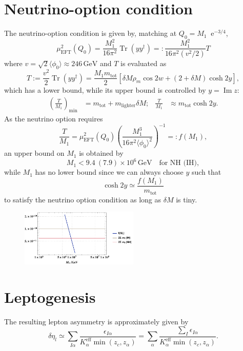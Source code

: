 \documentclass[a4paper,11pt]{scrartcl}
\numberwithin{equation}{section}
\newcommand\w[1]{_{\mathrm{#1}}}
\newcommand\ee{\mathop{}\!\mathrm{e}}
\DeclareMathOperator{\Tr}{\mathrm{Tr}}
\newcommand\vev[1]{\langle#1\rangle}
\newcommand\unit[1]{\,\mathrm{#1}\xspace}
\newcommand\GeV{\unit{GeV}}
\renewcommand{\Im}{\mathop{\mathrm{Im}}}
\newcommand\mtot{m_{\mathrm{tot}}}
\newcommand\yydag{(yy^\dagger)}
\begin{document}
\section{Neutrino-option condition}
The neutrino-option condition is given by, matching at $Q_0=M_1\ee^{-3/4}$,
\begin{equation}
 \mu^2\w{EFT}(Q_0)
= \frac{M_1^2}{16\pi^2}\Tr\yydag
=: \frac{M_1^2}{16\pi^2(v^2/2)}T
\end{equation}
where $v=\sqrt2\vev{\phi_0}\approx246\GeV$ and $T$ is evaluated as
\begin{equation}
 T :=\frac{v^2}{2}\Tr\yydag
   = \frac{M_1\mtot}{2}\left[\delta M \rho_m\cos2w + (2+\delta M)\cosh2y\right],
\end{equation}
which has a lower bound, while its upper bound is controlled by $y=\Im z$:
\begin{align}
\left(\frac{T}{M_1}\right)\w{min}&=\mtot + m\w{lighter}\delta M;&
\frac{T}{M_1}&\approx\mtot\cosh2y.
\end{align}
As the neutrino option requires
\begin{equation}
  \frac{T}{M_1}
=
  \mu^2\w{EFT}(Q_0) \left(\frac{M_1^3}{16\pi^2\vev{\phi_0}^2}\right)^{-1}=:f(M_1),
\end{equation}
an upper bound on $M_1$ is obtained by
\begin{equation}
 M_1<9.4\ (7.9)\times10^6\GeV\quad\text{for NH (IH)},
\end{equation}
while $M_1$ has no lower bound since we can always choose $y$ such that
\begin{equation}
 \cosh2y\simeq \frac{f(M_1)}{\mtot}
\end{equation}
to satisfy the neutrino option condition as long as $\delta M$ is tiny.



\begin{figure}[ht]
  \centering
  \includegraphics[width=0.5\textwidth]{bfp_analysis_fplot.pdf}
\end{figure}



\section{Leptogenesis}
The resulting lepton asymmetry is approximately given by
\begin{equation}
 \delta \eta_l\simeq
\sum_{I\alpha}\frac{\epsilon_{I\alpha}}{K_\alpha^{\mathrm{eff}}\min(z_c,z_\alpha)}=
\sum_{\alpha}\frac{\sum_I\epsilon_{I\alpha}}{K_\alpha^{\mathrm{eff}}\min(z_c,z_\alpha)}.
\end{equation}
\end{document}
